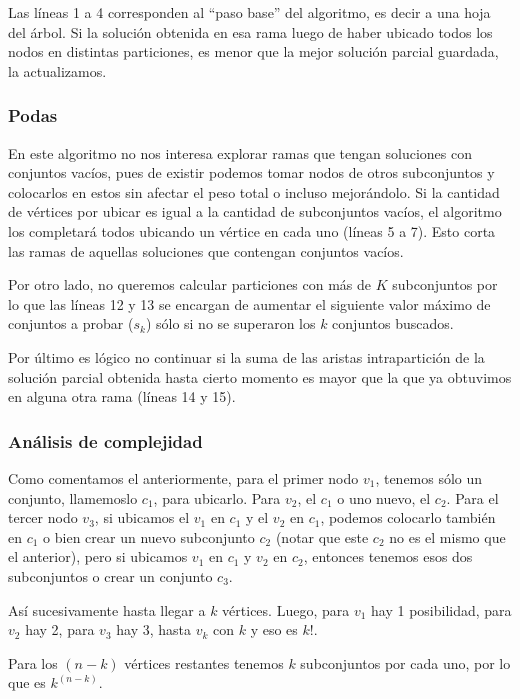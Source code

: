 Las l\'ineas 1 a 4 corresponden al ``paso base'' del algoritmo, es decir a una hoja del \'arbol. Si la soluci\'on obtenida en esa rama luego de haber ubicado todos los nodos en distintas particiones, es menor que la mejor soluci\'on parcial guardada, la actualizamos.

\subsubsection{Podas}

En este algoritmo no nos interesa explorar ramas que tengan soluciones con conjuntos vac\'ios, pues de existir podemos tomar nodos de otros subconjuntos y colocarlos en estos sin afectar el peso total o incluso mejor\'andolo.
Si la cantidad de v\'ertices por ubicar es igual a la cantidad de subconjuntos vac\'ios, el algoritmo los completar\'a todos ubicando un v\'ertice en cada uno (l\'ineas 5 a 7). Esto corta las ramas de aquellas soluciones que contengan conjuntos vac\'ios.

Por otro lado, no queremos calcular particiones con m\'as de $K$ subconjuntos por lo que las l\'ineas 12 y 13 se encargan de aumentar el siguiente valor m\'aximo de conjuntos a probar ($s_{k}$) s\'olo si no se superaron los $k$ conjuntos buscados.

Por \'ultimo es l\'ogico no continuar si la suma de las aristas intrapartici\'on de la soluci\'on parcial obtenida hasta cierto momento es mayor que la que ya obtuvimos en alguna otra rama (l\'ineas 14 y 15).

\subsubsection{An\'alisis de complejidad}

Como comentamos el anteriormente, para el primer nodo $v_1$, tenemos s\'olo un conjunto, llamemoslo $c_1$, para ubicarlo. Para $v_2$, el $c_1$ o uno nuevo, el $c_2$. Para el tercer nodo $v_3$, si ubicamos el $v_1$ en $c_1$ y el $v_2$ en $c_1$, podemos colocarlo tambi\'en en $c_1$ o bien crear un nuevo subconjunto $c_2$ (notar que este $c_2$ no es el mismo que el anterior), pero si ubicamos $v_1$ en $c_1$ y $v_2$ en $c_2$, entonces tenemos esos dos subconjuntos o crear un conjunto $c_3$.

Así sucesivamente hasta llegar a $k$ v\'ertices. Luego, para $v_1$ hay 1 posibilidad, para $v_2$ hay 2, para $v_3$ hay 3, hasta $v_k$ con $k$ y eso es $k!$.

Para los $(n-k)$ v\'ertices restantes tenemos $k$ subconjuntos por cada uno, por lo que es $k^{(n-k)}$.

